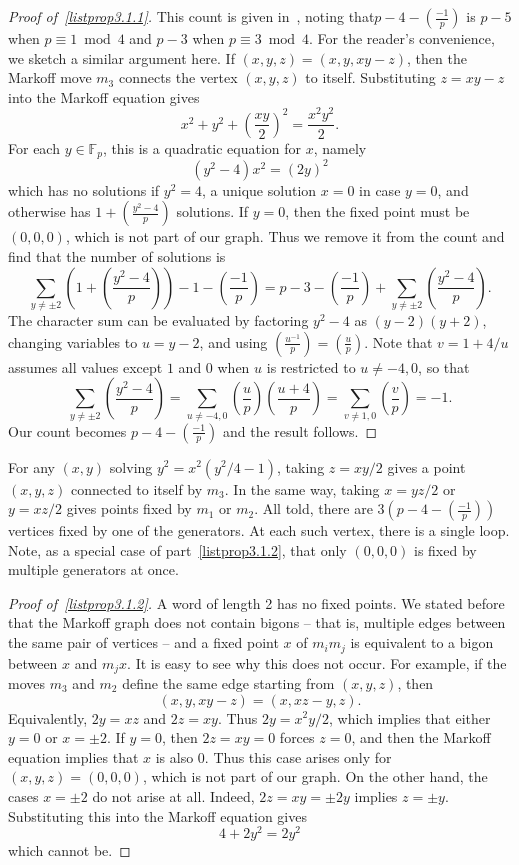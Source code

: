 \documentclass[10pt]{amsart}
\theoremstyle{definition}\newtheorem{defi}[theo]{Definition}\newtheorem{rema}[theo]{Remark}\newtheorem{exam}[theo]{Example}\newtheorem{exem}[theo]{Example}\newtheorem{nota}[theo]{Notation}
\newcommand{\F}{\mathbb{F}}
\newcommand{\legendre}[2]{\genfrac{(}{)}{}{}{#1}{#2}}
\begin{document}
\goodbreak
\begin{proof}[{Proof of~\eqref{listprop3.1.1}}]
This count is given in~\cite[Lemma~2.3]{CGMP}, noting that\linebreak$p-4 - (\tfrac{-1}{p})$ is $p-5$ when $p\equiv1\bmod4$ and $p-3$ when $p\equiv3\bmod4$. For the reader's convenience, we sketch a similar argument here. If $(x,y,z) = (x,y,xy-z)$, then the Markoff move $m_3$ connects the vertex $(x,y,z)$ to itself. Substituting $z = xy-z$ into the Markoff equation gives
\[
x^2 + y^2 + \left(\frac{xy}{2} \right)^2 = \frac{x^2y^2}{2}.
\]
For each $y \in \F_p$, this is a quadratic equation for $x$, namely
\[
(y^2 - 4)x^2 = (2y)^2
\]
which has no solutions if $y^2 = 4$, a unique solution $x=0$ in case $y=0$, and otherwise has $1 + (\tfrac{y^2-4}{p})$ solutions. If $y = 0$, then the fixed point must be $(0,0,0)$, which is not part of our graph. Thus we remove it from the count and find that the number of solutions is
\[
\sum_{y \neq \pm 2} \left(1 + \legendre{y^2-4}{p} \right) - 1 - \legendre{-1}{p} = p-3 - \legendre{-1}{p} + \sum_{y \neq \pm 2} \legendre{y^2-4}{p}.
\]
The character sum can be evaluated by factoring $y^2-4$ as $(y-2)(y+2)$, changing variables to $u = y-2$, and using $(\tfrac{u^{-1}}{p}) = (\tfrac{u}{p})$. Note that $v = 1 + 4/u$ assumes all values except $1$ and $0$ when $u$ is restricted to $u \neq -4,0$, so that
\[
\sum_{y \neq \pm 2 } \legendre{y^2-4}{p} = \sum_{u \neq -4,0} \legendre{u}{p} \legendre{u+4}{p} = \sum_{v \neq 1,0} \legendre{v}{p} = -1.
\]
Our count becomes $p-4 - (\tfrac{-1}{p})$ and the result follows.
\end{proof}

For any $(x,y)$ solving $y^2 = x^2(y^2/4-1)$, taking $z = xy/2$ gives a point $(x,y,z)$ connected to itself by $m_3$. In the same way, taking $x = yz/2$ or $y=xz/2$ gives points fixed by $m_1$ or $m_2$. All told, there are $3(p-4-(\tfrac{-1}{p}))$ vertices fixed by one of the generators. At each such vertex, there is a single loop. Note, as a special case of part~\eqref{listprop3.1.2}, that only $(0,0,0)$ is fixed by multiple generators at once.

\begin{proof}[{Proof of~\eqref{listprop3.1.2}}]
A word of length 2 has no fixed points. We stated before that the Markoff graph does not contain bigons -- that is, multiple edges between the same pair of vertices -- and a fixed point $x$ of $m_i m_j$ is equivalent to a bigon between $x$ and $m_j x$. It is easy to see why this does not occur. For example, if the moves $m_3$ and $m_2$ define the same edge starting from $(x,y,z)$, then
\[
(x,y,xy-z) = (x, xz-y, z).
\]
Equivalently, $2y = xz$ and $2z = xy$. Thus $2y = x^2y/2$, which implies that either $y=0$ or $x = \pm 2$. If $y=0$, then $2z = xy = 0$ forces $z=0$, and then the Markoff equation implies that $x$ is also 0. Thus this case arises only for $(x,y,z) = (0,0,0)$, which is not part of our graph. On the other hand, the cases $x = \pm 2$ do not arise at all. Indeed, $2z = xy = \pm 2y$ implies $z = \pm y$. Substituting this into the Markoff equation gives
\[
4 + 2y^2 = 2y^2
\]
which cannot be. 
\end{proof}
\end{document}
